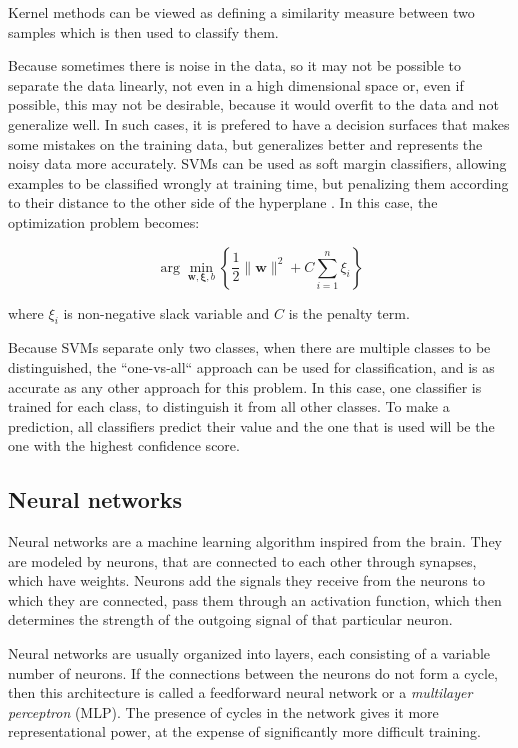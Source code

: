 Kernel methods can be viewed as defining a similarity measure between two samples which is then used to classify them. \cite{Vert}

Because sometimes there is noise in the data, so it may not be possible to separate the data linearly, not even in a high dimensional space or, even if possible, this may not be desirable, because it would overfit to the data and not generalize well. In such cases, it is prefered to have a decision surfaces that makes some mistakes on the training data, but generalizes better and represents the noisy data more accurately. SVMs can be used as soft margin classifiers, allowing examples to be classified wrongly at training time, but penalizing them according to their distance to the other side of the hyperplane \cite{russell1995artificial}. In this case, the optimization problem becomes: 

\[
\arg\min_{\mathbf{w},\mathbf{\xi}, b } \left\{\frac{1}{2} \|\mathbf{w}\|^2 + C \sum_{i=1}^n \xi_i \right\}
\]

where $ \xi_i $ is non-negative slack variable and $ C $ is the penalty term. 

Because SVMs separate only two classes, when there are multiple classes to be distinguished, the ``one-vs-all`` approach can be used for classification, and is as accurate as any other approach for this problem\cite{rifkin2004defense}. In this case, one classifier is trained for each class, to distinguish it from all other classes. To make a prediction, all classifiers predict their value and the one that is used will be the one with the highest confidence score.

\subsection{Neural networks}
Neural networks are a machine learning algorithm inspired from the brain. They are modeled by neurons, that are connected to each other through synapses, which have weights. Neurons add the signals they receive from the neurons to which they are connected, pass them through an activation function, which then determines the strength of the outgoing signal of that particular neuron. 

Neural networks are usually organized into layers, each consisting of a variable number of neurons. If the connections between the neurons do not form a cycle, then this architecture is called a feedforward neural network or a \textit{multilayer perceptron} (MLP). The presence of cycles in the network gives it more representational power, at the expense of significantly more difficult training. 


